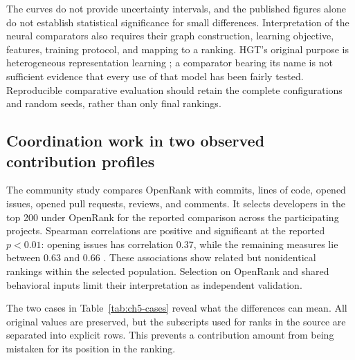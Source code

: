 The curves do not provide uncertainty intervals, and the published figures alone do not establish statistical significance for small differences. Interpretation of the neural comparators also requires their graph construction, learning objective, features, training protocol, and mapping to a ranking. HGT's original purpose is heterogeneous representation learning \citep{hu2020}; a comparator bearing its name is not sufficient evidence that every use of that model has been fairly tested. Reproducible comparative evaluation should retain the complete configurations and random seeds, rather than only final rankings.

\subsection{Coordination work in two observed contribution profiles}
The community study compares OpenRank with commits, lines of code, opened issues, opened pull requests, reviews, and comments. It selects developers in the top 200 under OpenRank for the reported comparison across the participating projects. Spearman correlations are positive and significant at the reported \(p<0.01\): opening issues has correlation 0.37, while the remaining measures lie between 0.63 and 0.66 \citep[Section 4.1.1]{zhao2024}. These associations show related but nonidentical rankings within the selected population. Selection on OpenRank and shared behavioral inputs limit their interpretation as independent validation.

The two cases in Table~\ref{tab:ch5-cases} reveal what the differences can mean. All original values are preserved, but the subscripts used for ranks in the source are separated into explicit rows. This prevents a contribution amount from being mistaken for its position in the ranking.

